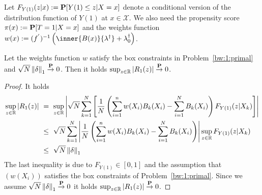 Let $F_{Y(1)}(z|x):=\P[Y(1)\le z|X=x]$ denote a conditional version of the distribution function of $Y(1)$ at $x\in\mathcal{X}$.
We also need the propensity score
$
  \pi(x):=\P[T=1|X=x]
$
and the weights function
$
  w(x)
  :=
  (
  f^{'}
  )^{-1}
  \left( 
    \inner{B(x)}{\lambda^\dagger}
    +
    \lambda_0^\dagger
  \right)
$.
\begin{lemma}
  \label{aa:mean:l:r1}
Let the weights function $w$ satisfy the box constraints in 
Problem~\ref{bw:1:primal} and 
$\sqrt{N}\norm{\delta}_1\overset{\P}{\to}0$.
Then it holds
$\sup_{z\in\R}|R_1(z)|\overset{\P}{\to}0$.
  \end{lemma}
\begin{proof}
It holds
  \begin{align}
    \label{R_1:1}
    \begin{split}
    \sup_{z\in\R}
    \left| 
    R_1(z)
    \right|
    &
    \ 
    =
    \ 
    \sup_{z\in\R}
    \left| 
  \sqrt{N}
  \sum_{k=1}^{N} 
  \left[ 
  \frac{1}{N}
  \left( 
    \sum_{i=1}^{n} 
    w(X_i)
    B_k(X_i)
    -
    \sum_{i=1}^{N} 
    B_k(X_i)
  \right)
  F_{Y(1)}(z|X_k)
  \right]
    \right|
    \\
    &
    \ 
    \le
    \ 
  \sqrt{N}
  \sum_{k=1}^{N} 
  \left| 
  \frac{1}{N}
  \left( 
    \sum_{i=1}^{n} 
    w(X_i)
    B_k(X_i)
    -
    \sum_{i=1}^{N} 
    B_k(X_i)
  \right)
  \right|
    \sup_{z\in\R}
  F_{Y(1)}(z|X_k)
  \\
    &
    \ 
    \le
    \ 
  \sqrt{N}
  \norm{\delta}_1
    \end{split}
  \end{align}
  The last inequality is due to $F_{Y(1)}\in[0,1]$ and the assumption that $(w(X_i))$ satisfies the box constraints of Problem~\ref{bw:1:primal}.
  Since we assume 
$\sqrt{N}\norm{\delta}_1\overset{\P}{\to}0$
it holds
$\sup_{z\in\R}|R_1(z)|\overset{\P}{\to}0$.
\end{proof}
